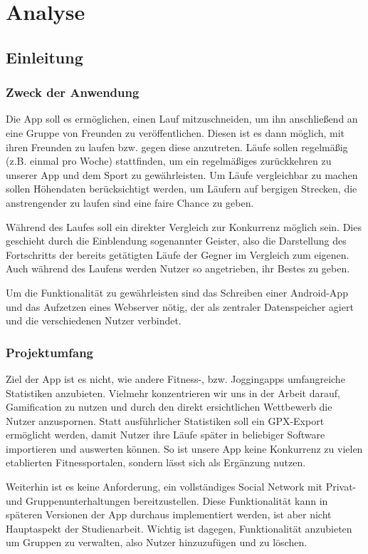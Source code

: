 \section{Analyse}\label{kapitel4}
\subsection{Einleitung}
\subsubsection{Zweck der Anwendung}
Die App soll es ermöglichen, einen Lauf mitzuschneiden, um ihn anschließend an eine Gruppe von Freunden zu veröffentlichen. Diesen ist es dann möglich, mit ihren Freunden zu laufen bzw. gegen diese anzutreten. Läufe sollen regelmäßig (z.B. einmal pro Woche) stattfinden, um ein regelmäßiges zurückkehren zu unserer App und dem Sport zu gewährleisten. Um Läufe vergleichbar zu machen sollen Höhendaten berücksichtigt werden, um Läufern auf bergigen Strecken, die anstrengender zu laufen sind eine faire Chance zu geben.

Während des Laufes soll ein direkter Vergleich zur Konkurrenz möglich sein. Dies geschieht durch die Einblendung sogenannter Geister, also die Darstellung des Fortschritts der bereits getätigten Läufe der Gegner im Vergleich zum eigenen. Auch während des Laufens werden Nutzer so angetrieben, ihr Bestes zu geben.

Um die Funktionalität zu gewährleisten sind das Schreiben einer Android-App und das Aufzetzen eines Webserver nötig, der als zentraler Datenspeicher agiert und die verschiedenen Nutzer verbindet.
\subsubsection{Projektumfang}
Ziel der App ist es nicht, wie andere Fitness-, bzw. Joggingapps umfangreiche Statistiken anzubieten. Vielmehr konzentrieren wir uns in der Arbeit darauf, Gamification zu nutzen und durch den direkt ersichtlichen Wettbewerb die Nutzer anzuspornen. Statt ausführlicher Statistiken soll ein GPX-Export ermöglicht werden, damit Nutzer ihre Läufe später in beliebiger Software importieren und auswerten können. So ist unsere App keine Konkurrenz zu vielen etablierten Fitnessportalen, sondern lässt sich als Ergänzung nutzen.

Weiterhin ist es keine Anforderung, ein vollständiges Social Network mit Privat- und Gruppenunterhaltungen bereitzustellen. Diese Funktionalität kann in späteren Versionen der App durchaus implementiert werden, ist aber nicht Hauptaspekt der Studienarbeit. Wichtig ist dagegen, Funktionalität anzubieten um Gruppen zu verwalten, also Nutzer hinzuzufügen und zu löschen.

